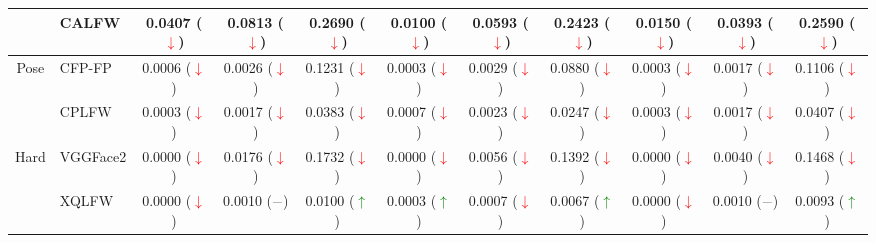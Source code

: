 \documentclass[class=report, crop=false, a4paper, 12pt]{standalone}
\begin{document}
\begin{table}[H]
{\begin{tabular}{cl|ccc|ccc|ccc|}
    \multicolumn{1}{|c|}{}                         & CALFW    & \multicolumn{1}{c|}{0.0407 (\textcolor{red}{$\downarrow$})} & \multicolumn{1}{c|}{0.0813 (\textcolor{red}{$\downarrow$})} & 0.2690 (\textcolor{red}{$\downarrow$}) & \multicolumn{1}{c|}{0.0100 (\textcolor{red}{$\downarrow$})} & \multicolumn{1}{c|}{0.0593 (\textcolor{red}{$\downarrow$})} & 0.2423 (\textcolor{red}{$\downarrow$}) & \multicolumn{1}{c|}{0.0150 (\textcolor{red}{$\downarrow$})} & \multicolumn{1}{c|}{0.0393 (\textcolor{red}{$\downarrow$})} & 0.2590 (\textcolor{red}{$\downarrow$}) \\ \hline
    \multicolumn{1}{|c|}{\multirow{2}{*}{Pose}}    & CFP-FP   & \multicolumn{1}{c|}{0.0006 (\textcolor{red}{$\downarrow$})} & \multicolumn{1}{c|}{0.0026 (\textcolor{red}{$\downarrow$})} & 0.1231 (\textcolor{red}{$\downarrow$}) & \multicolumn{1}{c|}{0.0003 (\textcolor{red}{$\downarrow$})} & \multicolumn{1}{c|}{0.0029 (\textcolor{red}{$\downarrow$})} & 0.0880 (\textcolor{red}{$\downarrow$}) & \multicolumn{1}{c|}{0.0003 (\textcolor{red}{$\downarrow$})} & \multicolumn{1}{c|}{0.0017 (\textcolor{red}{$\downarrow$})} & 0.1106 (\textcolor{red}{$\downarrow$}) \\ \cline{2-11} 
    \multicolumn{1}{|c|}{}                         & CPLFW    & \multicolumn{1}{c|}{0.0003 (\textcolor{red}{$\downarrow$})} & \multicolumn{1}{c|}{0.0017 (\textcolor{red}{$\downarrow$})} & 0.0383 (\textcolor{red}{$\downarrow$}) & \multicolumn{1}{c|}{0.0007 (\textcolor{red}{$\downarrow$})} & \multicolumn{1}{c|}{0.0023 (\textcolor{red}{$\downarrow$})} & 0.0247 (\textcolor{red}{$\downarrow$}) & \multicolumn{1}{c|}{0.0003 (\textcolor{red}{$\downarrow$})} & \multicolumn{1}{c|}{0.0017 (\textcolor{red}{$\downarrow$})} & 0.0407 (\textcolor{red}{$\downarrow$}) \\ \hline
    \multicolumn{1}{|c|}{\multirow{2}{*}{Hard}}    & VGGFace2 & \multicolumn{1}{c|}{0.0000 (\textcolor{red}{$\downarrow$})} & \multicolumn{1}{c|}{0.0176 (\textcolor{red}{$\downarrow$})} & 0.1732 (\textcolor{red}{$\downarrow$}) & \multicolumn{1}{c|}{0.0000 (\textcolor{red}{$\downarrow$})} & \multicolumn{1}{c|}{0.0056 (\textcolor{red}{$\downarrow$})} & 0.1392 (\textcolor{red}{$\downarrow$}) & \multicolumn{1}{c|}{0.0000 (\textcolor{red}{$\downarrow$})} & \multicolumn{1}{c|}{0.0040 (\textcolor{red}{$\downarrow$})} & 0.1468 (\textcolor{red}{$\downarrow$}) \\ \cline{2-11} 
    \multicolumn{1}{|c|}{}                         & XQLFW    & \multicolumn{1}{c|}{0.0000 (\textcolor{red}{$\downarrow$})} & \multicolumn{1}{c|}{0.0010 (\textcolor{gray}{$-$})} & 0.0100 (\textcolor{green}{$\uparrow$})   & \multicolumn{1}{c|}{0.0003 (\textcolor{green}{$\uparrow$})}   & \multicolumn{1}{c|}{0.0007 (\textcolor{red}{$\downarrow$})} & 0.0067 (\textcolor{green}{$\uparrow$})   & \multicolumn{1}{c|}{0.0000 (\textcolor{red}{$\downarrow$})} & \multicolumn{1}{c|}{0.0010 (\textcolor{gray}{$-$})} & 0.0093 (\textcolor{green}{$\uparrow$})   \\ \hline
    \end{tabular}%
    }
\end{table}
\end{document}
